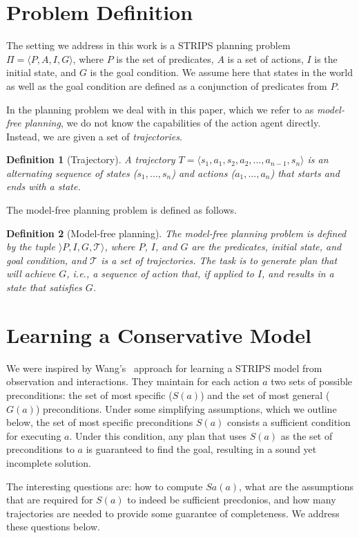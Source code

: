 \documentclass[letterpaper]{article}
\newtheorem{definition}{Definition}
\begin{document}
\section{Problem Definition}
The setting we address in this work is a STRIPS planning problem $\Pi=\langle P, A, I, G\rangle$, where $P$ is the set of predicates, $A$ is a set of actions, $I$ is the initial state, and $G$ is the goal condition. We assume here that states in the world as well as the goal condition are defined as a conjunction of predicates from $P$. 

In the planning problem we deal with in this paper, which we refer to as {\em model-free planning}, we do not know the capabilities of the action agent directly. Instead, we are given a set of {\em trajectories}. 
\begin{definition}[Trajectory]
A trajectory $T=\langle s_1, a_1, s_2, a_2, \ldots, a_{n-1}, s_n\rangle$ is an alternating sequence of states ($s_1,\ldots,s_n$) and actions ($a_1,\ldots,a_n$) that starts and ends with a state. 
\end{definition}
The model-free planning problem is defined as follows.
\begin{definition}[Model-free planning]
The model-free planning problem is defined by the tuple $\rangle P,I,G, \mathcal{T}\rangle$, 
where $P$, $I$, and $G$ are the predicates, initial state, and goal condition, and $\mathcal{T}$ is a set of trajectories. The task is to generate plan that will achieve $G$, i.e., a sequence of action that, if applied to $I$, and results in a state that satisfies $G$.
\end{definition}

\section{Learning a Conservative Model}
We were inspired by Wang's~\cite{wang1994learning,wang1995learning} approach for learning a STRIPS model from observation and interactions. They maintain for each action $a$ two sets of possible preconditions: the set of most specific ($S(a)$) and the set of most general ($G(a)$) preconditions. Under some simplifying assumptions, which we outline below, the set of most specific preconditions $S(a)$ consists a sufficient condition for executing $a$. Under this condition, any plan that uses $S(a)$ as the set of preconditions to $a$ is guaranteed to find the goal, resulting in a sound yet incomplete solution. 

The interesting questions are: how to compute $Sa(a)$, what are the assumptions that are required for $S(a)$ to indeed be sufficient precdonios, and how many trajectories are needed to provide some guarantee of completeness. We address these questions below. 
\end{document}
